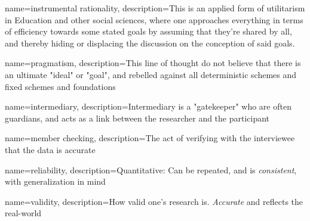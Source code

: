 {
	name={instrumental rationality},
	description={This is an applied form of utilitarism in Education and other social sciences, where one approaches everything in terms of efficiency towards some stated goals by assuming that they're shared by all, and thereby hiding or displacing the discussion on the conception of said goals. \parencite{bredo_philosophies_2006}}
}

{
	name={pragmatism},
	description={This line of thought do not believe that there is an ultimate "ideal" or "goal", and rebelled against all deterministic schemes and fixed schemes and foundations\parencite{bredo_philosophies_2006}}
}


{
	name={intermediary},
	description={Intermediary is a "gatekeeper" who are often guardians,  and acts as a link between the researcher and the participant}
}

{
	name={member checking},
	description={The act of verifying with the interviewee that the data is accurate}
}

{
	name={reliability},
	description={Quantitative: Can be repeated, and is \emph{consistent}, with generalization in mind}
}

{
	name={validity},
	description={How valid one's research is. \emph{Accurate} and reflects the real-world}
}